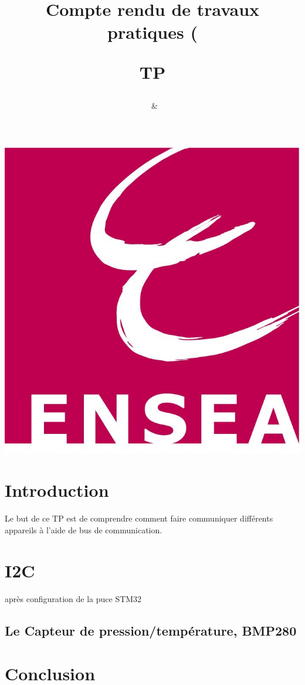 \documentclass{article}[a4paper]
\title{Compte rendu de travaux pratiques (\subject)\newline TP\numTP}
\author{\binomeUn \ \& \binomeDeux}
\begin{document}
	\maketitle
	\begin{center}
		\includegraphics{"Logo ENSEA"}
	\end{center}
	\tableofcontents
	
	\section*{Introduction}
	Le but de ce TP est de comprendre comment faire communiquer différents appareils à l'aide de bus de communication.
	
	\section{I2C}
		après configuration de la puce STM32

		\subsection{Le Capteur de pression/température, BMP280}
		
	
	\section{Conclusion}
	
\end{document}

